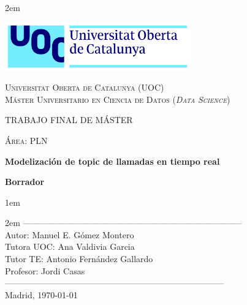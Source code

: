 \newpage
\thispagestyle{empty}

\baselineskip 2em


\centerline{\includegraphics[width=0.6\textwidth]{images/UOC-logo}}
\begin{center}
\textsc{Universitat Oberta de Catalunya (UOC) \\
 Máster Universitario en Ciencia de Datos (\textit{Data Science})\\}


\vspace*{1.5cm}

\textsc{\Large TRABAJO FINAL DE MÁSTER}

\vspace*{0.5cm}

\textsc{\large Área: PLN}



\vspace*{2.0cm}

\textbf{\Large Modelización de topic de llamadas en tiempo real}

\textbf{\large Borrador}

\vspace{2.5cm}
\baselineskip 1em

\baselineskip 2em
-----------------------------------------------------------------------------\\
Autor:      Manuel E. Gómez Montero\\
Tutora UOC:      Ana Valdivia Garcia\\
Tutor TE:      Antonio Fernández Gallardo\\
Profesor:   Jordi Casas\\
-----------------------------------------------------------------------------\\
\vspace*{1.5cm}
Madrid, \today

\end{center}

\newpage
\pagestyle{empty}
\hfill
